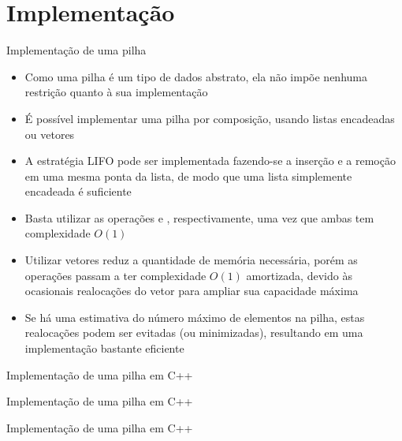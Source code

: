\section{Implementação}

\begin{frame}[fragile]{Implementação de uma pilha}

    \begin{itemize}
        \item Como uma pilha é um tipo de dados abstrato, ela não impõe nenhuma restrição
            quanto à sua implementação

        \item É possível implementar uma pilha por composição, usando listas encadeadas ou vetores

        \item A estratégia LIFO pode ser implementada fazendo-se a inserção e a remoção em uma
            mesma ponta da lista, de modo que uma lista simplemente encadeada é suficiente

        \item Basta utilizar as operações  e , 
            respectivamente, uma vez que ambas tem complexidade $O(1)$

        \item Utilizar vetores reduz a quantidade de memória necessária, porém as operações passam
            a ter complexidade $O(1)$ amortizada, devido às ocasionais realocações do vetor para
            ampliar sua capacidade máxima

        \item Se há uma estimativa do número máximo de elementos na pilha, estas realocações
            podem ser evitadas (ou minimizadas), resultando em uma implementação bastante
            eficiente
    \end{itemize}

\end{frame}

\begin{frame}[fragile]{Implementação de uma pilha em C++}
\end{frame}

\begin{frame}[fragile]{Implementação de uma pilha em C++}
\end{frame}

\begin{frame}[fragile]{Implementação de uma pilha em C++}
\end{frame}


